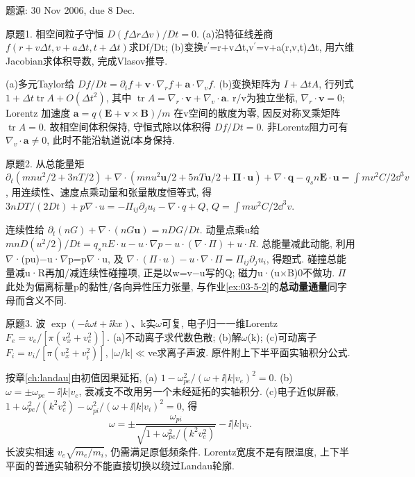 题源: 30 Nov 2006, due 8 Dec.
\begin{exercise}\label{ex:06-9-1}
原题1. 相空间粒子守恒 $D(f\Delta r\Delta v)/Dt=0$. (a)沿特征线差商 $f(r+v\Delta t,v+a\Delta t,t+\Delta t)$求Df/Dt; (b)变换r\ensuremath{{}^{\prime}}=r+v\ensuremath{\Delta}t,v\ensuremath{{}^{\prime}}=v+a(r,v,t)\ensuremath{\Delta}t, 用六维Jacobian求体积导数, 完成Vlasov推导.
\end{exercise}
\begin{solution}
(a)多元Taylor给 $Df/Dt=\partial_t f+\mathbf v\cdot\nabla_r f+\mathbf a\cdot\nabla_v f$. (b)变换矩阵为 $I+\Delta t A$, 行列式 $1+\Delta t\operatorname{tr}A+O(\Delta t^2)$, 其中 $\operatorname{tr}A=\nabla_r\cdot\mathbf v+\nabla_v\cdot\mathbf a$. r/v为独立坐标, $\nabla_r\cdot\mathbf v=0$; Lorentz 加速度 $\mathbf a=q(\mathbf E+\mathbf v\times\mathbf B)/m$ 在v空间的散度为零, 因反对称叉乘矩阵 $\operatorname{tr}A=0$. 故相空间体积保持, 守恒式除以体积得 $Df/Dt=0$. 非Lorentz阻力可有 $\nabla_v\cdot\mathbf a\ne0$, 此时不能沿轨道说f本身保持.
\end{solution}
\begin{exercise}\label{ex:06-9-2}
原题2. 从总能量矩
$\partial_t(mnu^2/2+3nT/2)+\nabla\cdot(mnu^2\mathbf u/2+5nT\mathbf u/2+\boldsymbol\Pi\cdot\mathbf u)+\nabla\cdot\mathbf q-q_s n\mathbf E\cdot\mathbf u=\int mv^2 C/2\dd^3v$,
用连续性、速度点乘动量和张量散度恒等式, 得 $3nDT/(2Dt)+p\nabla\cdot u=-\Pi_{ij}\partial_ju_i-\nabla\cdot q+Q$, $Q=\int mw^2C/2\dd^3v$.
\end{exercise}
\begin{solution}
连续性给 $\partial_t(nG)+\nabla\cdot(nG\mathbf u)=nDG/Dt$. 动量点乘u给 $mnD(u^2/2)/Dt=q_snE\cdot u-u\cdot\nabla p-u\cdot(\nabla\cdot\Pi)+u\cdot R$. 总能量减此动能, 利用\ensuremath{\nabla}·(pu)\ensuremath{-}u·\ensuremath{\nabla}p=p\ensuremath{\nabla}·u, 及 $\nabla\cdot(\Pi\cdot u)-u\cdot\nabla\cdot\Pi=\Pi_{ij}\partial_ju_i$, 得题式. 碰撞总能量减u·R再加/减连续性碰撞项, 正是以w=v\ensuremath{-}u写的Q; 磁力u·(u\ensuremath{\times}B)0不做功. \ensuremath{\Pi}此处为偏离标量p的黏性/各向异性压力张量, 与作业\ref{ex:03-5-2}的\textbf{总动量通量}同字母而含义不同.
\end{solution}
\begin{exercise}\label{ex:06-9-3}
原题3. 波 $\exp(-\ii\omega t+\ii kx)$、k实\ensuremath{\omega}可复, 电子归一一维Lorentz $F_e=v_e/[\pi(v_x^2+v_e^2)]$. (a)不动离子求代数色散; (b)解\ensuremath{\omega}(k); (c)可动离子 $F_i=v_i/[\pi(v_x^2+v_i^2)]$, |\ensuremath{\omega}/k|\ensuremath{\ll}ve求离子声波. 原件附上下半平面实轴积分公式.
\end{exercise}
\begin{solution}
按章\ref{ch:landau}由初值因果延拓, (a) $1-\omega_{pe}^2/(\omega+\ii|k|v_e)^2=0$. (b) $\omega=\pm\omega_{pe}-\ii|k|v_e$, 衰减支不改用另一个未经延拓的实轴积分. (c)电子近似屏蔽, $1+\omega_{pe}^2/(k^2v_e^2)-\omega_{pi}^2/(\omega+\ii|k|v_i)^2=0$, 得
\begin{equation}
 \omega=\pm\frac{\omega_{pi}}{\sqrt{1+\omega_{pe}^2/(k^2v_e^2)}}-\ii|k|v_i.
\end{equation}
长波实相速 $v_e\sqrt{m_e/m_i}$, 仍需满足原低频条件. Lorentz宽度不是有限温度, 上下半平面的普通实轴积分不能直接切换以绕过Landau轮廓.
\end{solution}
